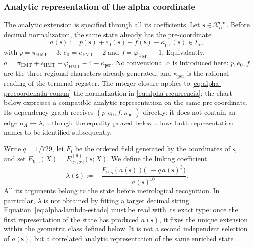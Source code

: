 \subsubsection{Analytic representation of the alpha coordinate}
\label{subsec:alpha-lector-completo-rev08}

The analytic extension is specified through all its coefficients.
Let \(\mathsf s\in\mathcal X_\alpha^{\mathrm{enr}}\). Before
decimal normalization, the same state already has the pre-coordinate
\begin{equation}
 a(\mathsf s):=p(\mathsf s)+e_0(\mathsf s)-f(\mathsf s)
                 -\kappa_{\mathrm{per}}(\mathsf s)\in I_\alpha,
 \label{eq:alpha-precoordenada-comun}
\end{equation}
with \(p=\pi_{\mathrm{HMT}}-3\),
\(e_0=e_{\mathrm{HMT}}-2\) and
\(f=\varphi_{\mathrm{HMT}}-1\). Equivalently,
\(a=\pi_{\mathrm{HMT}}+e_{\mathrm{HMT}}-
\varphi_{\mathrm{HMT}}-4-\kappa_{\mathrm{per}}\). No conventional
\(\alpha\) is introduced here: \(p,e_0,f\) are the three regional characters already
generated, and \(\kappa_{\mathrm{per}}\) is the rational reading of the terminal
register. The integer closure applies to
\eqref{eq:alpha-precoordenada-comun} the normalization in
\eqref{eq:alpha-recurrencia}; the chart below expresses a compatible
analytic representation on the same pre-coordinate. Its dependency
graph receives \((p,e_0,f,\kappa_{\mathrm{per}})\) directly: it does not
contain an edge \(\alpha_A\to\lambda\), although the equality proved below
allows both representation names to be identified subsequently.

Write \(q=1/729\), let \(F_{\mathsf s}\) be the ordered field generated by
the coordinates of \(\mathsf s\), and set
\(E_{9,\mathsf s}(X)=E_{21/22}^{(9)}(\mathsf s;X)\). We define the linking
coefficient
\begin{equation}
 \lambda(\mathsf s):=
 -\frac{E_{9,\mathsf s}(a(\mathsf s))
         \bigl(1-q\,a(\mathsf s)^3\bigr)}{a(\mathsf s)^{10}}.
 \label{eq:alpha-lambda-estado}
\end{equation}
All its arguments belong to the state before metrological
recognition. In particular, \(\lambda\) is not obtained by fitting a target
decimal string. Equation~\eqref{eq:alpha-lambda-estado} must be read with
its exact type: once the first representation of the state has produced
\(a(\mathsf s)\), it fixes the unique extension within the geometric class
defined below. It is not a second independent selection of
\(a(\mathsf s)\), but a correlated analytic representation of the same
enriched state.

